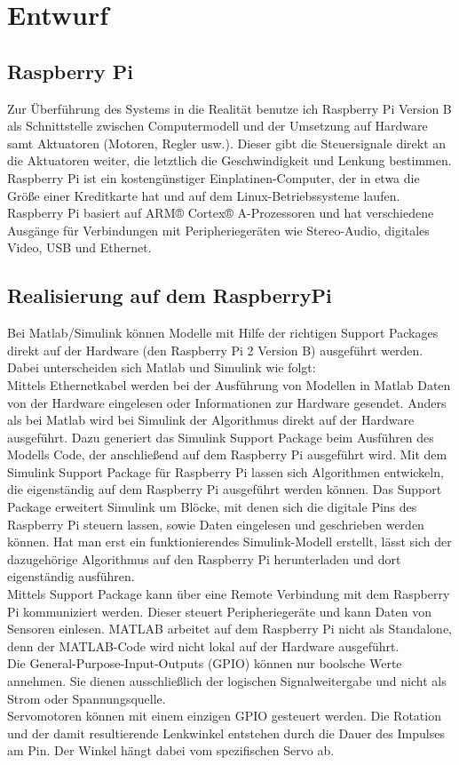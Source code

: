 \chapter{Entwurf}
\label{sec:entwurf}


\section{Raspberry Pi}
Zur Überführung des Systems in die Realität benutze ich Raspberry Pi Version B als Schnittstelle zwischen Computermodell und der Umsetzung auf Hardware samt Aktuatoren (Motoren, Regler usw.). Dieser gibt die Steuersignale direkt an die Aktuatoren weiter, die letztlich die Geschwindigkeit und Lenkung bestimmen. 
Raspberry Pi ist ein kostengünstiger Einplatinen-Computer, der in etwa die Größe einer Kreditkarte hat und auf dem Linux-Betriebssysteme laufen. Raspberry Pi basiert auf ARM® Cortex® A-Prozessoren und hat verschiedene Ausgänge für Verbindungen mit Peripheriegeräten wie Stereo-Audio, digitales Video, USB und Ethernet.


\section{Realisierung auf dem RaspberryPi}
\label{sec:Umsetzung}
Bei Matlab/Simulink können Modelle mit Hilfe der richtigen Support Packages direkt auf der Hardware (den Raspberry Pi 2 Version B) ausgeführt werden. Dabei unterscheiden sich Matlab und Simulink wie folgt: \\
Mittels Ethernetkabel werden bei der Ausführung von Modellen in Matlab Daten von der Hardware eingelesen oder Informationen zur Hardware gesendet.
Anders als bei Matlab wird bei Simulink der Algorithmus direkt auf der Hardware ausgeführt.
Dazu generiert das Simulink Support Package beim Ausführen des Modells Code, der anschließend auf dem Raspberry Pi ausgeführt wird.
Mit dem Simulink Support Package für Raspberry Pi lassen sich Algorithmen entwickeln, die eigenständig auf dem Raspberry Pi ausgeführt werden können. Das Support Package erweitert Simulink um Blöcke, mit denen sich die digitale Pins des Raspberry Pi steuern lassen, sowie Daten eingelesen und geschrieben werden können. Hat man erst ein funktionierendes Simulink-Modell erstellt, lässt sich der dazugehörige Algorithmus auf den Raspberry Pi herunterladen und dort eigenständig ausführen. \\
Mittels Support Package kann über eine Remote Verbindung mit dem Raspberry Pi kommuniziert werden. Dieser steuert Peripheriegeräte und kann Daten von Sensoren einlesen. MATLAB arbeitet auf dem Raspberry Pi nicht als Standalone, denn der MATLAB-Code wird nicht lokal auf der Hardware ausgeführt. \\
Die General-Purpose-Input-Outputs (GPIO) können nur boolsche Werte annehmen. Sie dienen ausschließlich der logischen Signalweitergabe und nicht als Strom oder Spannungsquelle. \\
Servomotoren können mit einem einzigen GPIO gesteuert werden. Die Rotation und der damit resultierende Lenkwinkel entstehen durch die Dauer des Impulses am Pin. Der Winkel hängt dabei vom spezifischen Servo ab. \\
\\

